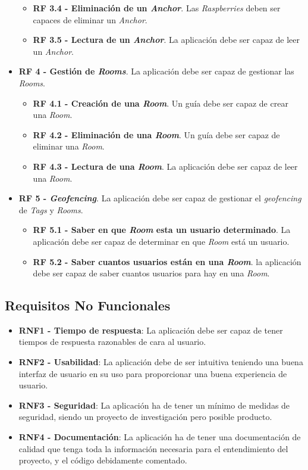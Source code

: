 \begin{itemize}
\begin{itemize}
            \item \textbf{RF 3.4 - Eliminación de un \textit{Anchor}}. Las \textit{Raspberries} deben ser capaces de eliminar un \textit{Anchor}.
            \item \textbf{RF 3.5 - Lectura de un \textit{Anchor}}. La aplicación debe ser capaz de leer un \textit{Anchor}.
        \end{itemize}
    \item \textbf{RF 4 - Gestión de \textit{Rooms}}. La aplicación debe ser capaz de gestionar las \textit{Rooms}.
        \begin{itemize}
            \item \textbf{RF 4.1 - Creación de una \textit{Room}}. Un guía debe ser capaz de crear una \textit{Room}.
            \item \textbf{RF 4.2 - Eliminación de una \textit{Room}}. Un guía debe ser capaz de eliminar una \textit{Room}.
            \item \textbf{RF 4.3 - Lectura de una \textit{Room}}. La aplicación debe ser capaz de leer una \textit{Room}.
        \end{itemize}
    
    \item \textbf{RF 5 - \textit{Geofencing}}. La aplicación debe ser capaz de gestionar el \textit{geofencing} de \textit{Tags} y \textit{Rooms}.
        \begin{itemize}
            \item \textbf{RF 5.1 - Saber en que \textit{Room} esta un usuario determinado}. La aplicación debe ser capaz de determinar en que \textit{Room} está un usuario.
            \item \textbf{RF 5.2 - Saber cuantos usuarios están en una \textit{Room}}. la aplicación debe ser capaz de saber cuantos usuarios para hay en una \textit{Room}.
        \end{itemize}


    
\end{itemize}
\subsection{Requisitos No Funcionales}
\begin{itemize}
    \item \textbf{RNF1 - Tiempo de respuesta}: La aplicación debe ser capaz de tener tiempos de respuesta razonables de cara al usuario.
    \item \textbf{RNF2 - Usabilidad}: La aplicación debe de ser intuitiva teniendo una buena interfaz de usuario en su uso para proporcionar una buena experiencia de usuario.
    \item \textbf{RNF3 - Seguridad}: La aplicación ha de tener un mínimo de medidas de seguridad, siendo un proyecto de investigación pero posible producto.
    \item \textbf{RNF4 - Documentación}: La aplicación ha de tener una documentación de calidad que tenga toda la información necesaria para el entendimiento del proyecto, y el código debidamente comentado.
    
\end{itemize}
